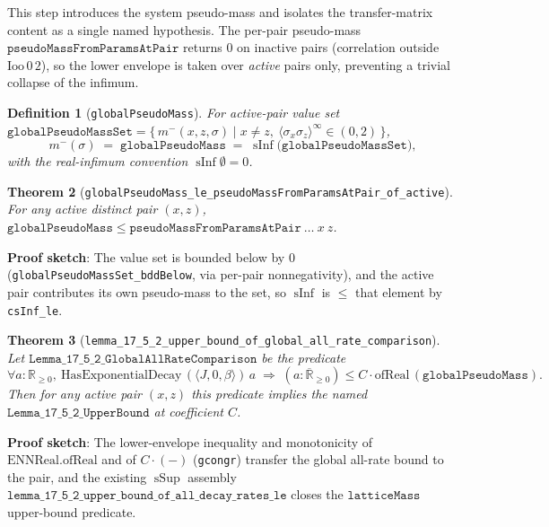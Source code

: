 \documentclass[a4paper,11pt]{article}
\newtheorem{theorem}{Theorem}
\newtheorem{definition}[theorem]{Definition}
\begin{document}
This step introduces the system pseudo-mass and isolates the transfer-matrix
content as a single named hypothesis.  The per-pair pseudo-mass
$\mathtt{pseudoMassFromParamsAtPair}$ returns $0$ on inactive pairs (correlation
outside $\mathrm{Ioo}\,0\,2$), so the lower envelope is taken over \emph{active}
pairs only, preventing a trivial collapse of the infimum.

\begin{definition}[\texttt{globalPseudoMass}]
For active-pair value set
$\mathtt{globalPseudoMassSet}=\{\,m^-(x,z,\sigma)\mid x\neq z,\
\langle\sigma_x\sigma_z\rangle^\infty\in(0,2)\,\}$,
\[
  m^-(\sigma) \;=\; \mathtt{globalPseudoMass}
  \;=\; \operatorname{sInf}\bigl(\mathtt{globalPseudoMassSet}\bigr),
\]
with the real-infimum convention $\operatorname{sInf}\emptyset=0$.
\end{definition}

\begin{theorem}[\texttt{globalPseudoMass\_le\_pseudoMassFromParamsAtPair\_of\_active}]
For any active distinct pair $(x,z)$,
$\mathtt{globalPseudoMass}\le\mathtt{pseudoMassFromParamsAtPair}\ \dots\ x\ z$.
\end{theorem}

\noindent\textbf{Proof sketch}:
The value set is bounded below by $0$
(\texttt{globalPseudoMassSet\_bddBelow}, via per-pair nonnegativity), and the
active pair contributes its own pseudo-mass to the set, so $\operatorname{sInf}$
is $\le$ that element by \texttt{csInf\_le}.

\begin{theorem}[\texttt{lemma\_17\_5\_2\_upper\_bound\_of\_global\_all\_rate\_comparison}]
Let $\mathtt{Lemma\_17\_5\_2\_GlobalAllRateComparison}$ be the predicate
\[
  \forall a:\mathbb{R}_{\ge0},\
  \mathrm{HasExponentialDecay}\,(\langle J,0,\beta\rangle)\,a
  \;\Rightarrow\;
  (a:\overline{\mathbb{R}}_{\ge0})\le C\cdot\mathrm{ofReal}\,(\mathtt{globalPseudoMass}).
\]
Then for any active pair $(x,z)$ this predicate implies the named
$\mathtt{Lemma\_17\_5\_2\_UpperBound}$ at coefficient $C$.
\end{theorem}

\noindent\textbf{Proof sketch}:
The lower-envelope inequality and monotonicity of
$\mathrm{ENNReal.ofReal}$ and of $C\cdot(-)$ (\texttt{gcongr}) transfer the
global all-rate bound to the pair, and the existing $\operatorname{sSup}$
assembly $\mathtt{lemma\_17\_5\_2\_upper\_bound\_of\_all\_decay\_rates\_le}$ closes
the $\mathtt{latticeMass}$ upper-bound predicate.
\end{document}
